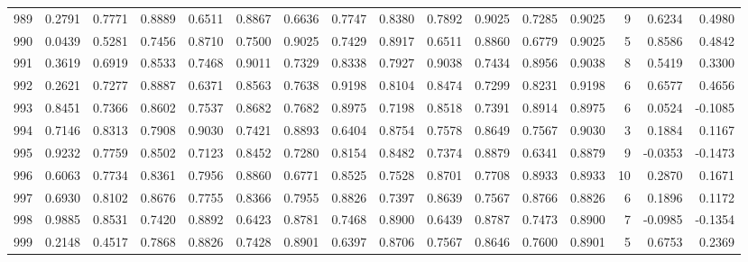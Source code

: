 \begin{tabular}{lrrrrrrrrrrrrrrr}
989 &      0.2791 &  0.7771 &  0.8889 &  0.6511 &  0.8867 &  0.6636 &  0.7747 &  0.8380 &  0.7892 &  0.9025 &   0.7285 &     0.9025 &      9 &                    0.6234 &                     0.4980 \\
990 &      0.0439 &  0.5281 &  0.7456 &  0.8710 &  0.7500 &  0.9025 &  0.7429 &  0.8917 &  0.6511 &  0.8860 &   0.6779 &     0.9025 &      5 &                    0.8586 &                     0.4842 \\
991 &      0.3619 &  0.6919 &  0.8533 &  0.7468 &  0.9011 &  0.7329 &  0.8338 &  0.7927 &  0.9038 &  0.7434 &   0.8956 &     0.9038 &      8 &                    0.5419 &                     0.3300 \\
992 &      0.2621 &  0.7277 &  0.8887 &  0.6371 &  0.8563 &  0.7638 &  0.9198 &  0.8104 &  0.8474 &  0.7299 &   0.8231 &     0.9198 &      6 &                    0.6577 &                     0.4656 \\
993 &      0.8451 &  0.7366 &  0.8602 &  0.7537 &  0.8682 &  0.7682 &  0.8975 &  0.7198 &  0.8518 &  0.7391 &   0.8914 &     0.8975 &      6 &                    0.0524 &                    -0.1085 \\
994 &      0.7146 &  0.8313 &  0.7908 &  0.9030 &  0.7421 &  0.8893 &  0.6404 &  0.8754 &  0.7578 &  0.8649 &   0.7567 &     0.9030 &      3 &                    0.1884 &                     0.1167 \\
995 &      0.9232 &  0.7759 &  0.8502 &  0.7123 &  0.8452 &  0.7280 &  0.8154 &  0.8482 &  0.7374 &  0.8879 &   0.6341 &     0.8879 &      9 &                   -0.0353 &                    -0.1473 \\
996 &      0.6063 &  0.7734 &  0.8361 &  0.7956 &  0.8860 &  0.6771 &  0.8525 &  0.7528 &  0.8701 &  0.7708 &   0.8933 &     0.8933 &     10 &                    0.2870 &                     0.1671 \\
997 &      0.6930 &  0.8102 &  0.8676 &  0.7755 &  0.8366 &  0.7955 &  0.8826 &  0.7397 &  0.8639 &  0.7567 &   0.8766 &     0.8826 &      6 &                    0.1896 &                     0.1172 \\
998 &      0.9885 &  0.8531 &  0.7420 &  0.8892 &  0.6423 &  0.8781 &  0.7468 &  0.8900 &  0.6439 &  0.8787 &   0.7473 &     0.8900 &      7 &                   -0.0985 &                    -0.1354 \\
999 &      0.2148 &  0.4517 &  0.7868 &  0.8826 &  0.7428 &  0.8901 &  0.6397 &  0.8706 &  0.7567 &  0.8646 &   0.7600 &     0.8901 &      5 &                    0.6753 &                     0.2369 \\
\bottomrule
\end{tabular}
